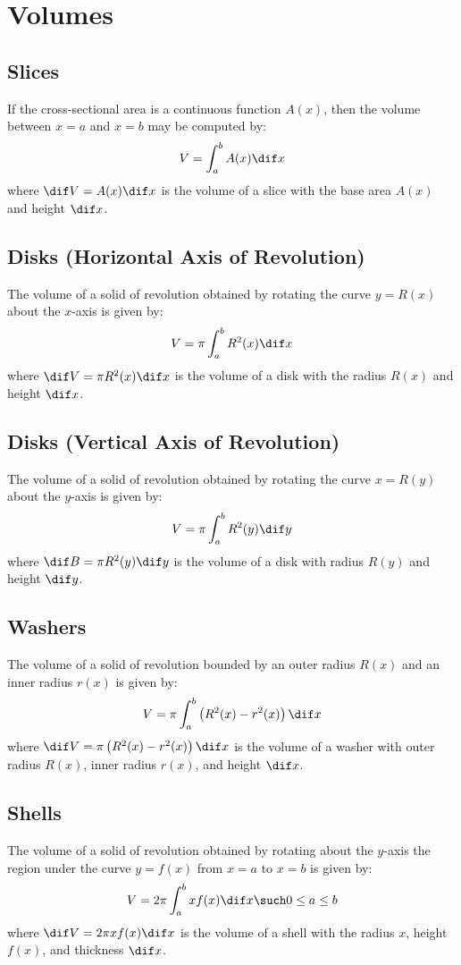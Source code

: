 \section{Volumes}
\subsection{Slices}
	If the cross-sectional area is a continuous function $A(x)$, then the volume between $x=a$ and $x=b$ may be computed by:
	\[V = \int_a^b A(x) \dif x\]
	where $\dif V = A(x) \dif x$ is the volume of a slice with the base area $A(x)$ and height $\dif x$.
\subsection{Disks (Horizontal Axis of Revolution)}
	The volume of a solid of revolution obtained by rotating the curve $y=R(x)$ about the $x$-axis is given by:
	\[V = \pi \int_a^b R^2(x) \dif x\]
	where $\dif V = \pi R^2(x) \dif x$ is the volume of a disk with the radius $R(x)$ and height $\dif x$.
\subsection{Disks (Vertical Axis of Revolution)}
	The volume of a solid of revolution obtained by rotating the curve $x = R(y)$ about the $y$-axis is given by:
	\[V = \pi \int_a^b R^2(y) \dif y\]
	where $\dif B = \pi R^2(y) \dif y$ is the volume of a disk with radius $R(y)$ and height $\dif y$.
\subsection{Washers}
	The volume of a solid of revolution bounded by an outer radius $R(x)$ and an inner radius $r(x)$ is given by:
	\[V = \pi \int_a^b \left( R^2(x) - r^2(x) \right) \dif x\]
	where $\dif V = \pi\left( R^2(x) - r^2(x) \right) \dif x$ is the volume of a washer with outer radius $R(x)$, inner radius $r(x)$, and height $\dif x$.
\subsection{Shells}
	The volume of a solid of revolution obtained by rotating about the $y$-axis the region under the curve $y=f(x)$ from $x=a$ to $x=b$ is given by:
	\[V = 2\pi \int_a^b xf(x) \dif x \such 0 \leq a \leq b\]
	where $\dif V = 2\pi xf(x)\dif x$ is the volume of a shell with the radius $x$, height $f(x)$, and thickness $\dif x$.
